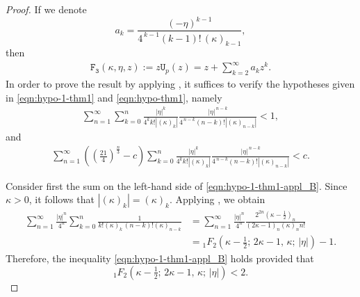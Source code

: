 \documentclass[a4paper,11pt,reqno]{amsart}
\begin{document}
\begin{proof}
   If we denote 
\[
   a_k= \frac{(-\eta)^{k-1}}{4^{\,k-1}(k-1)!\, (\kappa)_{k-1}}, 
\]
then 
\begin{align*}
		\mathtt{F_3}(\kappa, \eta, z):= z \mathtt{U}_p(z)= z+\sum_{k=2}^{\infty} a_k z^{k}.
\end{align*}
In order to prove the result by applying , it suffices to verify the hypotheses given in \eqref{eqn:hypo-1-thm1} and \eqref{eqn:hypo-thm1}, namely 
\begin{align}\label{eqn:hypo-1-thm1-appl_B}
\sum_{n=1}^{\infty}  \sum_{k=0}^n  \frac{|\eta|^{k}}{4^k k! |(\kappa)_{k}|}  \frac{|\eta|^{\,n-k}}{4^{\,n-k} (n-k)! |(\kappa)_{n-k}|} < 1,
\end{align}
and 
\begin{align}\label{eqn:hypo-thm1-appl_B}
\sum_{n=1}^{\infty} \left( \left(\tfrac{21}{4}\right)^{\tfrac{n}{3}}- c\right) \sum_{k=0}^n  \frac{|\eta|^{k}}{4^k k! |(\kappa)_{k}|}  \frac{|\eta|^{\,n-k}}{4^{\,n-k} (n-k)! |(\kappa)_{n-k}|} < c.
\end{align}



\noindent
Consider first the sum on the left-hand side of \eqref{eqn:hypo-1-thm1-appl_B}.  
Since $\kappa>0$, it follows that $|(\kappa)_{k}|=(\kappa)_{k}$.  
Applying , we obtain
\begin{align*}
\sum_{n=1}^{\infty} \frac{|\eta|^{n}}{4^n} \sum_{k=0}^n  
 \frac{1}{ k! (\kappa)_{k}\, (n-k)! (\kappa)_{n-k}} 
&=\sum_{n=1}^{\infty} \frac{|\eta|^{n}}{4^n}  
   \frac{ 2^{2n} \left(\kappa-\tfrac{1}{2}\right)_{n}}{\left(2\kappa-1\right)_{n} \left(\kappa\right)_{n} n!}\\
&=  {}_1F_{2}\!\left( \kappa-\tfrac{1}{2};\, 2\kappa-1,\, \kappa;\,  |\eta|\right)-1.
\end{align*}
Therefore, the inequality \eqref{eqn:hypo-1-thm1-appl_B} holds provided that 
\[
 {}_1F_{2}\!\left( \kappa-\tfrac{1}{2};\, 2\kappa-1,\, \kappa;\,  |\eta|\right) < 2.
\]




\end{proof}
\end{document}
